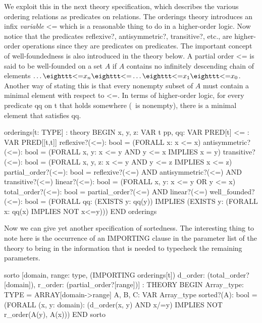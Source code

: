 We exploit this in the next theory specification, which describes the
various ordering relations as predicates on relations.  The {\stt
orderings} theory introduces an infix {\em variable\/} {\stt <=} which
is a reasonable thing to do in a higher-order logic.  Now notice that
the predicates {\stt reflexive?}, {\stt antisymmetric?}, {\stt
transitive?}, etc., are higher-order operations since they are
predicates on predicates.  The important concept of well-foundedness is
also introduced in the theory below.  A partial order {\stt <=} is said
to be well-founded on a set $A$ if $A$ contains no infinitely descending
chain of elements $\ldots \mbox{\tt <=} x_n \mbox{\tt <=} \ldots
\mbox{\tt <=} x_1 \mbox{\tt <=} x_0$.  Another way of stating this is
that every nonempty subset of $A$ must contain a minimal element with
respect to {\stt <=}.  In terms of higher-order logic, for every
predicate {\stt qq} on {\stt t} that holds somewhere (\ie\ is nonempty),
there is a minimal element that satisfies {\stt qq}.

\begin{pvsex}
  orderings[t: TYPE] : theory
   BEGIN
    x, y, z: VAR t
    pp, qq: VAR PRED[t]
    <= : VAR PRED[[t,t]]
    reflexive?(<=): bool =  (FORALL x: x <= x)
    antisymmetric?(<=): bool = (FORALL x, y: x <= y AND y <= x IMPLIES x = y)
    transitive?(<=): bool =
      (FORALL x, y, z: x <= y AND y <= z IMPLIES x <= z)
    partial\_order?(<=): bool =
      reflexive?(<=) AND antisymmetric?(<=) AND transitive?(<=)
    linear?(<=): bool = (FORALL x, y: x <= y OR y <= x)
    total\_order?(<=): bool = partial\_order?(<=) AND linear?(<=)
    well\_founded?(<=): bool =
      (FORALL qq: (EXISTS y: qq(y))
           IMPLIES (EXISTS y: (FORALL x: qq(x) IMPLIES NOT x<=y)))
   END orderings
\end{pvsex}

Now we can give yet another specification of sortedness.  The
interesting thing to note here is the occurrence of an {\stt IMPORTING}
clause in the parameter list of the theory to bring in the information
that is needed to typecheck the remaining parameters.
\begin{pvsex}
  sorto [domain, range: type,
         (IMPORTING orderings[t])
         d\_order: (total\_order?[domain]),
         r\_order: (partial\_order?[range])] : THEORY
   BEGIN
    Array\_type: TYPE = ARRAY[domain->range]
    A, B, C: VAR Array\_type
    sorted?(A): bool =
      (FORALL (x, y: domain): (d\_order(x, y) AND x/=y)
                      IMPLIES NOT r\_order(A(y), A(x)))
   END sorto
\end{pvsex}

